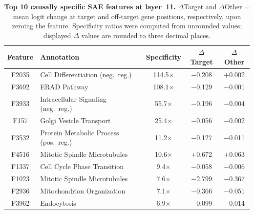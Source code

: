 \documentclass[onecolumn]{article}
\begin{document}
\begin{table}[H]
\centering
\caption{\textbf{Top 10 causally specific SAE features at layer~11.} $\Delta$Target and $\Delta$Other = mean logit change at target and off-target gene positions, respectively, upon zeroing the feature. Specificity ratios were computed from unrounded values; displayed $\Delta$ values are rounded to three decimal places.}
\label{tab:causal_top10}
\smallskip
\begin{tabular}{clccc}
\toprule
Feature & Annotation & Specificity & $\Delta$Target & $\Delta$Other \\
\midrule
F2035 & Cell Differentiation (neg.\ reg.) & 114.5$\times$ & $-$0.208 & $+$0.002 \\
F3692 & ERAD Pathway & 108.1$\times$ & $-$0.129 & $-$0.001 \\
F3933 & Intracellular Signaling (neg.\ reg.) & 55.7$\times$ & $-$0.196 & $-$0.004 \\
F157  & Golgi Vesicle Transport & 25.4$\times$ & $-$0.056 & $-$0.002 \\
F3532 & Protein Metabolic Process (pos.\ reg.) & 11.2$\times$ & $-$0.127 & $-$0.011 \\
F4516 & Mitotic Spindle Microtubules & 10.6$\times$ & $+$0.672 & $+$0.063 \\
F1337 & Cell Cycle Phase Transition & 9.4$\times$ & $-$0.058 & $-$0.006 \\
F1023 & Mitotic Spindle Microtubules & 7.6$\times$ & $-$2.799 & $-$0.367 \\
F2936 & Mitochondrion Organization & 7.1$\times$ & $-$0.366 & $-$0.051 \\
F3962 & Endocytosis & 6.9$\times$ & $-$0.099 & $-$0.014 \\
\bottomrule
\end{tabular}
\end{table}
\end{document}

